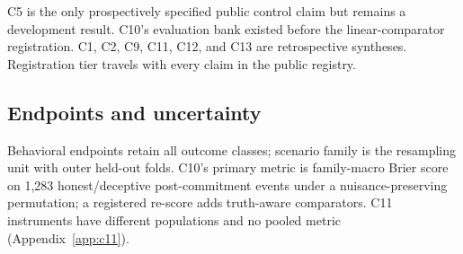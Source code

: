 \begin{table}[t]
\caption{Evidence ladder and information budget. ``Post'' means the committed status token is
causally visible. ``Oracle'' means scenario truth supplies the target route.}
\label{tab:ladder}
\centering
\small
{}
\end{table}

C5 is the only prospectively specified public control claim but remains a development
result. C10's evaluation bank existed before the linear-comparator registration. C1, C2,
C9, C11, C12, and C13 are retrospective syntheses. Registration tier travels with every
claim in the public registry.

\subsection{Endpoints and uncertainty}

Behavioral endpoints retain all outcome classes; scenario family is the resampling unit with
outer held-out folds. C10's primary metric is family-macro Brier score on 1,283
honest/deceptive post-commitment events under a nuisance-preserving permutation; a registered
re-score adds truth-aware comparators. C11 instruments have different populations and no
pooled metric (Appendix~\ref{app:c11}).
